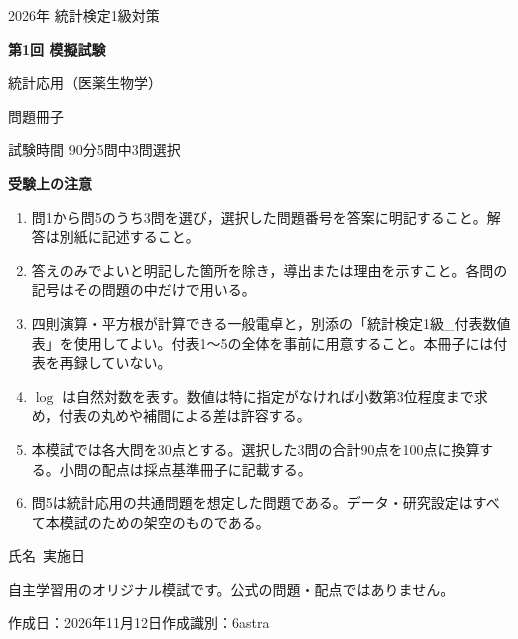 \documentclass[a4paper,11pt]{ltjsarticle}
\begin{document}
\thispagestyle{empty}
\begin{center}
\vspace*{10mm}
{\large 2026年 統計検定1級対策}\par\vspace{7mm}
{\Huge\bfseries 第1回 模擬試験}\par\vspace{6mm}
{\LARGE 統計応用（医薬生物学）}\par\vspace{6mm}
{\Large 問題冊子}\par\vspace{10mm}
{\large 試験時間 90分\qquad 5問中3問選択}
\end{center}
\vspace{6mm}
\noindent\textbf{受験上の注意}
\begin{enumerate}[label=\arabic*.,leftmargin=2em,itemsep=0.65em]
\item 問1から問5のうち3問を選び，選択した問題番号を答案に明記すること。解答は別紙に記述すること。
\item 答えのみでよいと明記した箇所を除き，導出または理由を示すこと。各問の記号はその問題の中だけで用いる。
\item 四則演算・平方根が計算できる一般電卓と，別添の「統計検定1級\_付表数値表」を使用してよい。付表1～5の全体を事前に用意すること。本冊子には付表を再録していない。
\item $\log$ は自然対数を表す。数値は特に指定がなければ小数第3位程度まで求め，付表の丸めや補間による差は許容する。
\item 本模試では各大問を30点とする。選択した3問の合計90点を100点に換算する。小問の配点は採点基準冊子に記載する。
\item 問5は統計応用の共通問題を想定した問題である。データ・研究設定はすべて本模試のための架空のものである。
\end{enumerate}
\vfill
\begin{center}
氏名\ \underline{\hspace{55mm}}\qquad 実施日\ \underline{\hspace{35mm}}\par\vspace{8mm}
\small 自主学習用のオリジナル模試です。公式の問題・配点ではありません。\par
作成日：2026年11月12日\qquad 作成識別：6astra
\end{center}
\newpage
\end{document}
